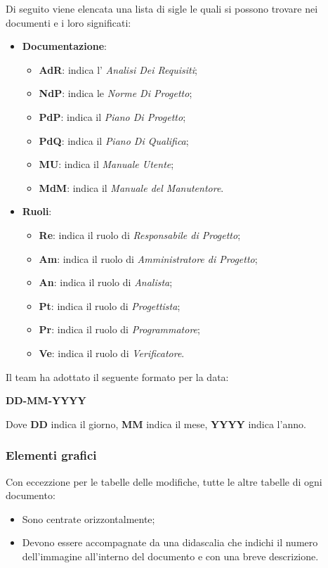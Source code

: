 Di seguito viene elencata una lista di sigle le quali si possono trovare nei documenti e i loro significati:
\begin {itemize}
\item \textbf{Documentazione}:
	\begin {itemize}
	\item \textbf{AdR}: indica l' \textit{Analisi Dei Requisiti};
	\item \textbf{NdP}: indica le \textit{Norme Di Progetto};
	\item \textbf{PdP}: indica il \textit{Piano Di Progetto};
	\item \textbf{PdQ}: indica il \textit{Piano Di Qualifica};
	\item \textbf{MU}: indica il \textit{Manuale Utente};
	\item \textbf{MdM}: indica il \textit{Manuale del Manutentore}.
	\end {itemize}
\item \textbf{Ruoli}:
	\begin {itemize}
	\item \textbf{Re}: indica il ruolo di \textit{Responsabile di Progetto};
	\item \textbf{Am}: indica il ruolo di \textit{Amministratore di Progetto};
	\item \textbf{An}: indica il ruolo di \textit{Analista};
	\item \textbf{Pt}: indica il ruolo di \textit{Progettista};
	\item \textbf{Pr}: indica il ruolo di \textit{Programmatore};
	\item \textbf{Ve}: indica il ruolo di \textit{Verificatore}.
	\end {itemize}
\end {itemize}
Il team ha adottato il seguente formato per la data:
\begin{center}
    \large{\textbf{DD-MM-YYYY}}
\end{center}
Dove \textbf{DD} indica il giorno, \textbf{MM} indica il mese, \textbf{YYYY} indica l'anno.

\subsubsection{Elementi grafici}

Con eccezzione per le tabelle delle modifiche, tutte le altre tabelle di ogni documento:
\begin {itemize}
\item Sono centrate orizzontalmente;
\item Devono essere accompagnate da una didascalia che indichi il numero dell'immagine all'interno del documento e con una breve descrizione.
\end {itemize}

